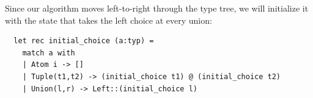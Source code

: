 \documentclass[a4paper,english]{lipics-v2019}
\begin{document}


Since our algorithm moves left-to-right through the type tree, we will
initialize it with the state that takes the left choice at every union:

\begin{small}
\begin{verbatim}
  let rec initial_choice (a:typ) = 
    match a with
    | Atom i -> []
    | Tuple(t1,t2) -> (initial_choice t1) @ (initial_choice t2)
    | Union(l,r) -> Left::(initial_choice l)
\end{verbatim}
\end{small}
\end{document}
